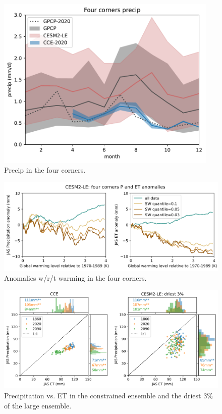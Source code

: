 \documentclass[11pt]{article}
\begin{document}
\begin{figure}[h]
\centering
\includegraphics[width=25pc]{figs/main/precip.pdf}
\caption{Precip in the four corners.}
\label{fig:precip}
\end{figure}


\newpage

\begin{figure}[h]
\centering
\includegraphics[width=40pc]{figs/main/anomalies.png}
\caption{Anomalies w/r/t warming in the four corners.}
\label{fig:anomalies}
\end{figure}


\newpage
\begin{figure}[h]
\centering
\includegraphics[width=40pc]{figs/main/scatter_ET_P.png}
\caption{Precipitation vs. ET in the constrained ensemble and the driest 3\% of the large ensemble.}
\label{fig:precip}
\end{figure}
\end{document}
